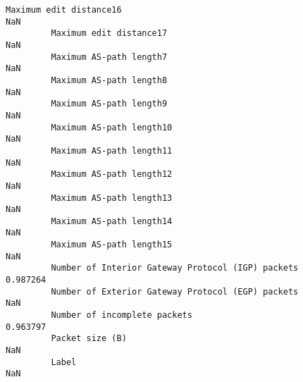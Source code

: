\documentclass[11pt]{article}
\begin{document}
\begin{Verbatim}[commandchars=\\\{\}]
         Maximum edit distance16                                                          NaN   
         Maximum edit distance17                                                          NaN   
         Maximum AS-path length7                                                          NaN   
         Maximum AS-path length8                                                          NaN   
         Maximum AS-path length9                                                          NaN   
         Maximum AS-path length10                                                         NaN   
         Maximum AS-path length11                                                         NaN   
         Maximum AS-path length12                                                         NaN   
         Maximum AS-path length13                                                         NaN   
         Maximum AS-path length14                                                         NaN   
         Maximum AS-path length15                                                         NaN   
         Number of Interior Gateway Protocol (IGP) packets                           0.987264   
         Number of Exterior Gateway Protocol (EGP) packets                                NaN   
         Number of incomplete packets                                                0.963797   
         Packet size (B)                                                                  NaN   
         Label                                                                            NaN   
         

\end{Verbatim}
\end{document}
